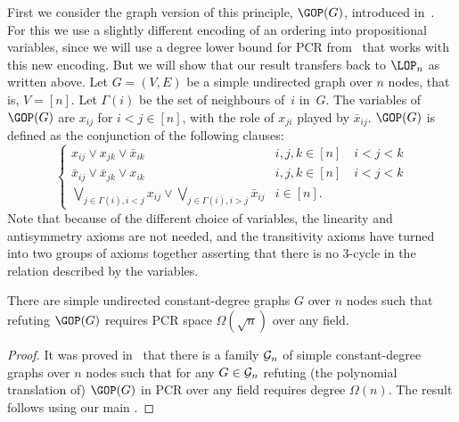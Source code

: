 First we consider the graph version of this principle, $\GOP(G)$, introduced
in~\cite{DBLP:journals/siamcomp/SegerlindBI04}.
For this we use a slightly different encoding of an ordering into propositional variables,
since we will use a degree lower bound for PCR from~\cite{DBLP:journals/tocl/GalesiL10}
that works with this new encoding. But we will show that our result transfers back
to $\LOP_n$ as written above.
Let $G=(V,E)$ be a simple undirected graph over $n$ nodes, that is, $V=[n]$.
Let $\Gamma(i)$ be the set of neighbours of~$i$ in~$G$.
The variables of $\GOP(G)$ are $x_{ij}$ for $i<j \in [n]$, with the role of $x_{ji}$ played
by $\bar x_{ij}$. $\GOP(G)$ is defined as the conjunction of the following clauses:
$$
\left \{
\begin{array}{ll}
x_{ij} \vee x_{jk} \vee \bar x_{ik} &  i,j,k \in [n] \quad i<j<k  \\
\bar x_{ij} \vee \bar x_{jk} \vee x_{ik} &  i,j,k \in [n] \quad i<j<k \\
\bigvee_{j\in \Gamma(i), i<j} x_{ij} \vee \bigvee_{j\in \Gamma(i), i>j} \bar x_{ij} & i \in[n].
\end{array}
\right.
$$
Note that because of the different choice of variables, the linearity and antisymmetry axioms are not needed,
and the transitivity axioms have turned into
two groups of axioms together asserting
that there is no 3-cycle in the relation described by the variables. 


\begin{theorem}
\label{cor:GOP}
There are simple undirected constant-degree graphs $G$ over $n$ nodes such that refuting
$\GOP(G)$ requires PCR space $\Omega(\sqrt{n})$ over any field. 
\end{theorem}

\begin{proof}
It was proved in~\cite{DBLP:journals/tocl/GalesiL10} that there is a family ${\cal G}_n$ of simple constant-degree graphs over $n$ nodes such that  for any $G \in  {\cal G}_n$ 
refuting (the polynomial translation of) $\GOP(G)$ in PCR over any field  requires degree $\Omega(n)$.
The result follows using our main .
\end{proof}

